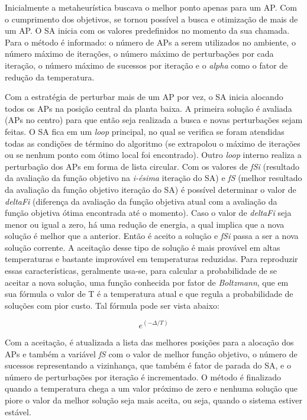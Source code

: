 \documentclass[
	12pt,				%
	openright,			%
	twoside,			%
	a4paper,			%
	english,			%
	french,				%
	spanish,			%
	brazil				%
	]{abntex2}
\begin{document}
Inicialmente a metaheurística buscava o melhor ponto apenas para um AP. Com o cumprimento dos objetivos,  se tornou possível a busca e otimização de mais de um AP. O SA inicia com os valores predefinidos no momento da sua chamada. Para o método é informado: o número de APs a serem utilizados no ambiente, o número máximo de iterações, o número máximo de perturbações por cada iteração, o número máximo de sucessos por iteração e o \textit{alpha} como o fator de redução da temperatura.

Com a estratégia de perturbar mais de um AP por vez, o SA inicia alocando todos os APs na posição central da planta baixa. A primeira solução é avaliada (APs no centro) para que  então seja realizada a busca e novas perturbações sejam feitas. O SA fica em um \textit{loop} principal, no qual se verifica se foram atendidas todas as condições de término do algoritmo (se extrapolou o máximo de iterações ou se nenhum ponto com ótimo local foi encontrado).  Outro \textit{loop} interno realiza a perturbação dos APs em forma de lista circular. Com os valores de \textit{fSi} (resultado da avaliação da função objetivo na \textit{i-ésima} iteração do SA) e \textit{fS} (melhor resultado da avaliação da função objetivo iteração do SA) é possível determinar o valor de \textit{deltaFi} (diferença da avaliação da função objetiva atual com a avaliação da função objetiva ótima encontrada até o momento). Caso o valor de \textit{deltaFi} seja menor ou igual a zero, há uma redução de energia, a qual implica que a nova solução é melhor que a anterior. Então é aceito a solução e \textit{fSi} passa a ser a nova solução corrente. A aceitação desse tipo de solução é mais provável em altas temperaturas e bastante improvável em temperaturas reduzidas. Para reproduzir essas características, geralmente usa-se, para calcular a probabilidade de se aceitar a nova solução, uma função conhecida por fator de \textit{Boltzmann}, que em sua fórmula o valor de T é a temperatura atual e que regula a probabilidade de soluções com pior custo. Tal fórmula pode ser vista abaixo:

\begin{equation}
e^{(-\Delta/T)}
\end{equation}

Com a aceitação, é atualizada a lista das melhores posições para a alocação dos APs e também a variável \textit{fS} com o valor de melhor função objetivo, o número de sucessos representando a vizinhança, que também é fator de parada do SA, e o número de perturbações por iteração é incrementado. O método é finalizado quando a temperatura chega a um valor próximo de zero e nenhuma solução que piore o valor da melhor solução seja mais aceita, ou seja, quando o sistema estiver estável.
\end{document}
